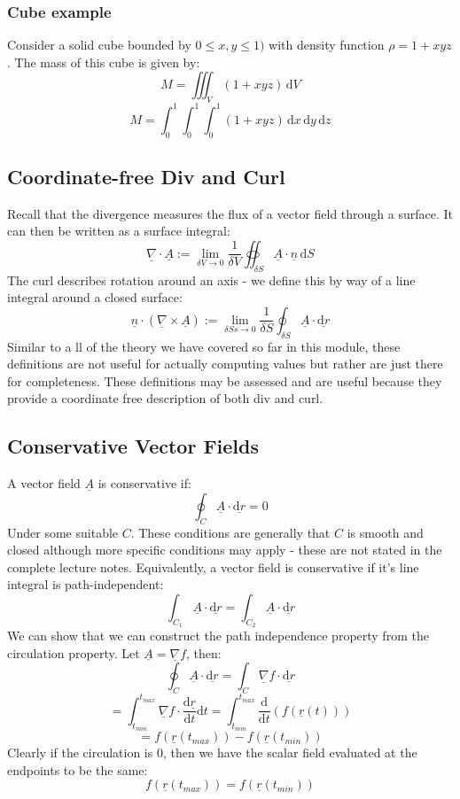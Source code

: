 \documentclass[12pt]{article}
\newcommand{\df}[2]{\frac{\text{d}#1}{\text{d}#2}}
\newcommand{\dive}[1]{\underline{\nabla}\cdot\underline{#1}}
\newcommand{\grad}[1]{\underline{\nabla}#1}
\newcommand{\curl}[1]{\underline{\nabla}\times \underline{#1}}
\begin{document}
\subsubsection{Cube example}
Consider a solid cube bounded by \(0\leq x,y\leq 1)\) with density function \(\rho=1+xyz\). The mass of this cube is given by:
\[M=\iiint_V(1+xyz)\,\text{d}V\]
\[M=\int^1_0\int^1_0\int^1_0(1+xyz)\,\text{d}x\,\text{d}y\,\text{d}z\]
\subsection{Coordinate-free Div and Curl}
Recall that the divergence measures the flux of a vector field through a surface. It can then be written as a surface integral:
\[\dive{A}:=\lim_{\delta V\to 0}\frac{1}{\delta V}\oiint_{\delta S}\underline{A}\cdot \underline{n}\,\text{d}S \]
The curl describes rotation around an axis - we define this by way of a line integral around a closed surface:
\[\underline{n}\cdot (\curl{A}):=\lim_{\delta Ss\to 0}\frac{1}{\delta S}\oint_{\delta S}\underline{A}\cdot \underline{\text{d}r}\]
Similar to a ll of the theory we have covered so far in this module, these definitions are not useful for actually computing values but rather are just there for completeness. These definitions may be assessed and are useful because they provide a coordinate free description of both div and curl.
\subsection{Conservative Vector Fields}
A vector field \(\underline{A}\) is conservative if:
\[\oint_C\underline{A}\cdot \underline{\text{d}r}=0\]
Under some suitable \(C\). These conditions are generally that \(C\) is smooth and closed although more specific conditions may apply - these are not stated in the complete lecture notes. Equivalently, a vector field is conservative if it's line integral is path-independent:
\[\int_{C_1}\underline{A}\cdot\underline{\text{d}r}=\int_{C_2}\underline{A}\cdot\underline{\text{d}r}\]
We can show that we can construct the path independence property from the circulation property. Let \(\underline{A}=\underline{\nabla}f\), then:
\[\oint_C\underline{A}\cdot\underline{\text{d}r}=\int_C\grad{f}\cdot\underline{\text{d}r}\]
\[=\int^{t_{max}}_{t_{min}}\grad{f}\cdot \df{\underline{r}}{t}\text{d}t=\int^{t_{max}}_{t_{min}}\df{}{t}\left(f(\underline{r}(t))\right)\]
\[=f(\underline{r}(t_{max}))-f(\underline{r}(t_{min}))\]
Clearly if the circulation is 0, then we have the scalar field evaluated at the endpoints to be the same:
\[f(\underline{r}(t_{max}))=f(\underline{r}(t_{min}))\]
\end{document}
